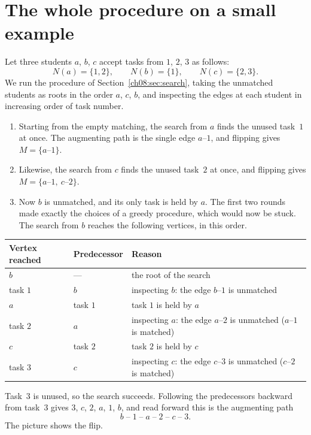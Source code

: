 \section{The whole procedure on a small example}\label{sec:matching-trace}
Let three students $a$, $b$, $c$ accept tasks from $1$, $2$, $3$ as follows:
\[
N(a)=\{1,2\},\qquad N(b)=\{1\},\qquad N(c)=\{2,3\}.
\]
We run the procedure of Section~\ref{ch08:sec:search}, taking the unmatched students as roots in the order $a$, $c$, $b$, and inspecting the edges at each student in increasing order of task number.
\begin{enumerate}
\item Starting from the empty matching, the search from $a$ finds the unused task~$1$ at once. The augmenting path is the single edge $a$--$1$, and flipping gives $M=\{a\text{--}1\}$.
\item Likewise, the search from $c$ finds the unused task~$2$ at once, and flipping gives $M=\{a\text{--}1,\ c\text{--}2\}$.
\item Now $b$ is unmatched, and its only task is held by $a$. The first two rounds made exactly the choices of a greedy procedure, which would now be stuck. The search from $b$ reaches the following vertices, in this order.
\end{enumerate}
\begin{center}
\begin{tabularx}{\linewidth}{@{}llX@{}}
\toprule
Vertex reached & Predecessor & Reason\\
\midrule
$b$ & --- & the root of the search\\
task $1$ & $b$ & inspecting $b$: the edge $b$--$1$ is unmatched\\
$a$ & task $1$ & task $1$ is held by $a$\\
task $2$ & $a$ & inspecting $a$: the edge $a$--$2$ is unmatched ($a$--$1$ is matched)\\
$c$ & task $2$ & task $2$ is held by $c$\\
task $3$ & $c$ & inspecting $c$: the edge $c$--$3$ is unmatched ($c$--$2$ is matched)\\
\bottomrule
\end{tabularx}
\end{center}
Task~$3$ is unused, so the search succeeds. Following the predecessors backward from task~$3$ gives $3$, $c$, $2$, $a$, $1$, $b$, and read forward this is the augmenting path
\[
b\;\text{--}\;1\;\text{--}\;a\;\text{--}\;2\;\text{--}\;c\;\text{--}\;3.
\]
The picture shows the flip.

